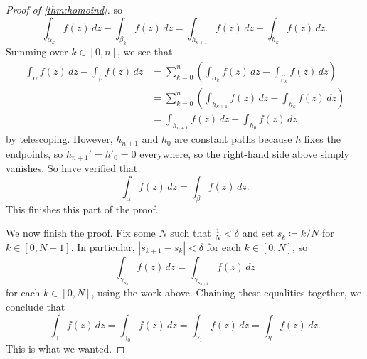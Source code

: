 \begin{proof}[Proof of \autoref{thm:homoind}]
	so
	\[\int_{\alpha_k}f(z)\,dz-\int_{\beta_k}f(z)\,dz=\int_{h_{k+1}}f(z)\,dz-\int_{h_k}f(z)\,dz.\]
	Summing over $k\in[0,n]$, we see that
	\begin{align*}
		\int_\alpha f(z)\,dz-\int_\beta f(z)\,dz &= \sum_{k=0}^n\left(\int_{\alpha_k}f(z)\,dz-\int_{\beta_k}f(z)\,dz\right) \\
		&= \sum_{k=0}^n\left(\int_{h_{k+1}}f(z)\,dz-\int_{h_k}f(z)\,dz\right) \\
		&= \int_{h_{n+1}}f(z)\,dz-\int_{h_0}f(z)\,dz
	\end{align*}
	by telescoping. However, $h_{n+1}$ and $h_0$ are constant paths because $h$ fixes the endpoints, so $h_{n+1}'=h'_0=0$ everywhere, so the right-hand side above simply vanishes. So have verified that
	\[\int_\alpha f(z)\,dz=\int_\beta f(z)\,dz.\]
	This finishes this part of the proof.

	We now finish the proof. Fix some $N$ such that $\frac1N<\delta$ and set $s_k\coloneqq k/N$ for $k\in[0,N+1]$. In particular, $|s_{k+1}-s_k|<\delta$ for each $k\in[0,N]$, so
	\[\int_{\gamma_{s_k}}f(z)\,dz=\int_{\gamma_{s_{k+1}}}f(z)\,dz\]
	for each $k\in[0,N]$, using the work above. Chaining these equalities together, we conclude that
	\[\int_\gamma f(z)\,dz=\int_{\gamma_0}f(z)\,dz=\int_{\gamma_1}f(z)\,dz=\int_\eta f(z)\,dz.\]
	This is what we wanted.
\end{proof}